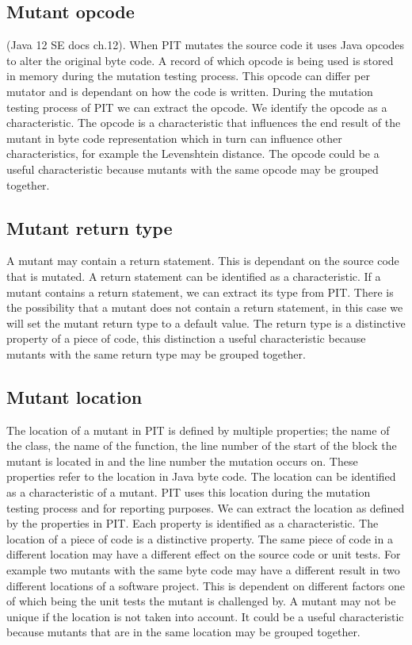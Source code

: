 \documentclass[../../main]{subfiles}
\begin{document}
\subsection{Mutant opcode}
 (Java 12 SE docs ch.12).
When PIT mutates the source code it uses Java opcodes to alter the original byte code. 
A record of which opcode is being used is stored in memory during the mutation testing process. 
This opcode can differ per mutator and is dependant on how the code is written.
During the mutation testing process of PIT we can extract the opcode.
We identify the opcode as a characteristic.
The opcode is a characteristic that influences the end result of the mutant in byte code representation which in turn can influence other characteristics, for example the Levenshtein distance.
The opcode could be a useful characteristic because mutants with the same opcode may be grouped together.

\subsection{Mutant return type}
A mutant may contain a return statement. 
This is dependant on the source code that is mutated.
A return statement can be identified as a characteristic.
If a mutant contains a return statement, we can extract its type from PIT.
There is the possibility that a mutant does not contain a return statement, in this case we will set the mutant return type to a default value.
The return type is a distinctive property of a piece of code, this distinction a useful characteristic because mutants with the same return type may be grouped together.


\subsection{Mutant location}\label{ch:characteristics_location}
The location of a mutant in PIT is defined by multiple properties;
the name of the class, the name of the function, the line number of the start of the block the mutant is located in and the line number the mutation occurs on.
These properties refer to the location in Java byte code.
The location can be identified as a characteristic of a mutant.
PIT uses this location during the mutation testing process and for reporting purposes.
We can extract the location as defined by the properties in PIT.
Each property is identified as a characteristic.
The location of a piece of code is a distinctive property. 
The same piece of code in a different location may have a different effect on the source code or unit tests.
For example two mutants with the same byte code may have a different result in two different locations of a software project. 
This is dependent on different factors one of which being the unit tests the mutant is challenged by.
A mutant may not be unique if the location is not taken into account.
It could be a useful characteristic because mutants that are in the same location may be grouped together.
\end{document}
